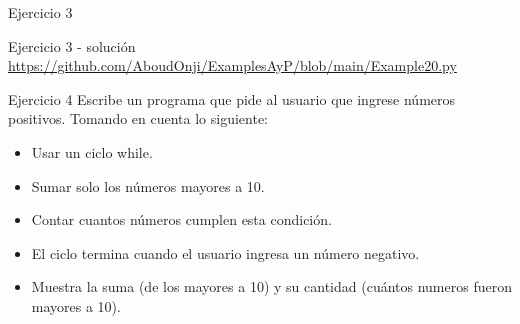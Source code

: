 \documentclass[aspectratio=169,xcolor=dvipsnames]{beamer}
\begin{document}
\begin{frame}{Ejercicio 3}
\begin{block}{Ejercicio 3 - solución}
\url{https://github.com/AboudOnji/ExamplesAyP/blob/main/Example20.py}

\end{block}
\end{frame}

\begin{frame}{Ejercicio 4}
Escribe un programa que pide al usuario que ingrese números positivos. Tomando en cuenta lo siguiente:
\begin{itemize}
    \item Usar un ciclo while.
    \item Sumar solo los números mayores a 10.
    \item Contar cuantos números cumplen esta condición.
    \item El ciclo termina cuando el usuario ingresa un número negativo.
    \item Muestra la suma (de los mayores a 10) y su cantidad (cuántos numeros fueron mayores a 10).
\end{itemize}

\end{frame}

\end{document}
